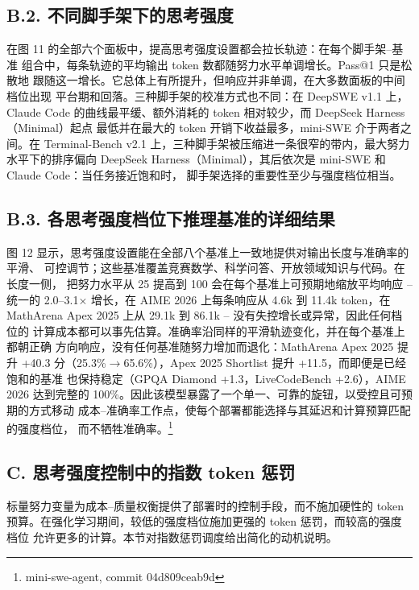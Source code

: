 \subsection{B.2. 不同脚手架下的思考强度}\label{b.2.-reasoning-efforts-across-scaffolds}

在图 11 的全部六个面板中，提高思考强度设置都会拉长轨迹：在每个脚手架--基准
组合中，每条轨迹的平均输出 token 数都随努力水平单调增长。Pass@1 只是松散地
跟随这一增长。它总体上有所提升，但响应并非单调，在大多数面板的中间档位出现
平台期和回落。三种脚手架的校准方式也不同：在 DeepSWE v1.1 上，Claude Code
的曲线最平缓、额外消耗的 token 相对较少，而 DeepSeek Harness（Minimal）起点
最低并在最大的 token 开销下收益最多，mini-SWE 介于两者之间。在 Terminal-Bench
v2.1 上，三种脚手架被压缩进一条很窄的带内，最大努力水平下的排序偏向 DeepSeek
Harness（Minimal），其后依次是 mini-SWE 和 Claude Code：当任务接近饱和时，
脚手架选择的重要性至少与强度档位相当。

\subsection{B.3. 各思考强度档位下推理基准的详细结果}\label{b.3.-detailed-results-of-reasoning-benchmarks-across-reasoning-efforts}

图 12 显示，思考强度设置能在全部八个基准上一致地提供对输出长度与准确率的平滑、
可控调节；这些基准覆盖竞赛数学、科学问答、开放领域知识与代码。在长度一侧，
把努力水平从 25 提高到 100 会在每个基准上可预期地缩放平均响应 -- 统一的
2.0--3.1$\times$ 增长，在 AIME 2026 上每条响应从 4.6k 到 11.4k token，在
MathArena Apex 2025 上从 29.1k 到 86.1k -- 没有失控增长或异常，因此任何档位的
计算成本都可以事先估算。准确率沿同样的平滑轨迹变化，并在每个基准上都朝正确
方向响应，没有任何基准随努力增加而退化：MathArena Apex 2025 提升 +40.3
分（25.3\%$\to$65.6\%），Apex 2025 Shortlist 提升 +11.5，而即便是已经饱和的基准
也保持稳定（GPQA Diamond +1.3，LiveCodeBench +2.6），AIME 2026 达到完整的
100\%。因此该模型暴露了一个单一、可靠的旋钮，以受控且可预期的方式移动
成本--准确率工作点，使每个部署都能选择与其延迟和计算预算匹配的强度档位，
而不牺牲准确率。\footnote{mini-swe-agent, commit 04d809ceab9d}


\subsection{C. 思考强度控制中的指数 token 惩罚}\label{c.-exponential-token-penalty-in-reasoning-effort-control}

标量努力变量为成本--质量权衡提供了部署时的控制手段，而不施加硬性的 token
预算。在强化学习期间，较低的强度档位施加更强的 token 惩罚，而较高的强度档位
允许更多的计算。本节对指数惩罚调度给出简化的动机说明。

